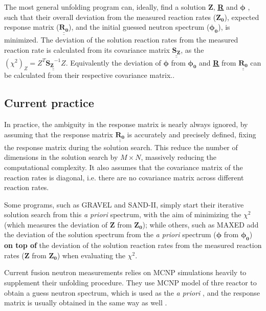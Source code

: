 \documentclass[a4paper, 12pt]{article}
\newcommand{\matr}[1]{\underline{\underline{\textbf{#1}}}}
\newcommand{\ve}[1]{\boldsymbol{#1}}
\begin{document}
The most general unfolding program can, ideally, find a solution $\ve{Z}$, \matr{R} and $\ve{\phi}$ \cite{theorypdf}, such that their overall deviation from the measured reaction rates ($\ve{Z_0}$), expected response matrix ($\underline{\underline{\mathbf{R_0}}}$), and the initial guessed neutron spectrum ($\ve{\phi_0}$), is minimized. The deviation of the solution reaction rates from the measured reaction rate is calculated from its covariance matrix $\underline{\underline{\mathbf{S_Z}}}$, as the $(\chi^2)_Z = Z^T \underline{\underline{\mathbf{S_Z}^{-1}}} Z$. Equivalently the deviation of $\ve{\phi}$ from $\ve{\phi_0}$ and \matr{R} from $\underline{\underline{\mathbf{R_0}}}$ can be calculated from their respective covariance matrix..

\subsection{Current practice}
In practice, the ambiguity in the response matrix is nearly always ignored, by assuming that the response matrix $\underline{\underline{\mathbf{R_0}}}$ is accurately and precisely defined, fixing the response matrix during the solution search. This reduce the number of dimensions in the solution search by $M\times N$, massively reducing the computational complexity. It also assumes that the covariance matrix of the reaction rates is diagonal, i.e. there are no covariance matrix across different reaction rates.

Some programs, such as GRAVEL\cite{ManfredMatzkeHEPRO} and SAND-II\cite{SAND-II}, simply start their iterative solution search from this \emph{a priori} spectrum, with the aim of minimizing the $\chi^2$ (which measures the deviation of $\ve{Z}$ from $\ve{Z_0}$); while others, such as MAXED \cite{MAXED1998Reginatto} add the deviation of the solution spectrum from the \emph{a priori} spectrum ($\ve{\phi}$ from $\ve{\phi_0}$) \textbf{on top of} the deviation of the solution reaction rates from the measured reaction rates ($\ve{Z}$ from $\ve{Z_0}$) when evaluating the $\chi^2$.

Current fusion neutron measurements relies on MCNP simulations heavily to supplement their unfolding procedure. They use MCNP model of thre reactor to obtain a guess neutron spectrum, which is used as the \emph{a priori} \cite{MatzkeUnfoldingProcedure} \cite{InternalReportOnDeliverables_LWP}, and the response matrix is usually obtained in the same way as well \cite{bethColling_TBMD}.
\end{document}
